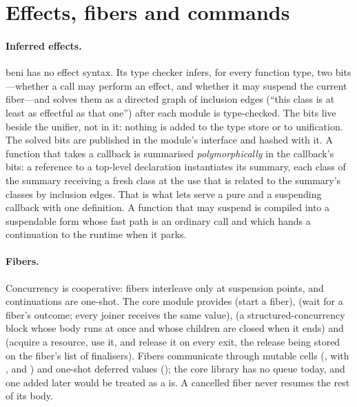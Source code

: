 \section{Effects, fibers and commands}
\label{sec:bg-effects}

\paragraph{Inferred effects.} beni has no effect syntax. Its type checker infers, for every function
type, two bits---whether a call may perform an effect, and whether it may suspend the current
fiber---and solves them as a directed graph of inclusion edges (``this class is at least as
effectful as that one'') after each module is type-checked. The bits live beside the unifier, not in
it: nothing is added to the type store or to unification. The solved bits are published in the
module's interface and hashed with it. A function that takes a callback is summarised
\emph{polymorphically} in the callback's bits: a reference to a top-level declaration instantiates its
summary, each class of the summary receiving a fresh class at the use that is related to the
summary's classes by inclusion edges. That is what lets  serve a pure and a suspending
callback with one definition. A function that may suspend is compiled into a suspendable form whose
fast path is an ordinary call and which hands a continuation to the runtime when it parks.

\paragraph{Fibers.} Concurrency is cooperative: fibers interleave only at suspension points, and
continuations are one-shot. The core  module provides  (start a fiber),
 (wait for a fiber's outcome; every joiner receives the same value),  (a
structured-concurrency block whose body runs at once and whose children are closed when it ends) and
 (acquire a resource, use it, and release it on every exit, the release being stored on
the fiber's list of finalisers). Fibers communicate through mutable cells (, with
,  and ) and one-shot deferred values (); the core
library has no queue today, and one added later would be treated as a  is. A cancelled
fiber never resumes the rest of its body.

